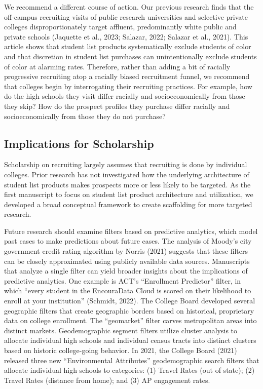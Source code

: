 \documentclass[
  12pt,
]{article}
\begin{document}
We recommend a different course of action. Our previous research finds that the off-campus recruiting visits of public research universities and selective private colleges disproportionately target affluent, predominantly white public and private schools (Jaquette et al., 2023; Salazar, 2022; Salazar et al., 2021). This article shows that student list products systematically exclude students of color and that discretion in student list purchases can unintentionally exclude students of color at alarming rates. Therefore, rather than adding a bit of racially progressive recruiting atop a racially biased recruitment funnel, we recommend that colleges begin by interrogating their recruiting practices. For example, how do the high schools they visit differ racially and socioeconomically from those they skip? How do the prospect profiles they purchase differ racially and socioeconomically from those they do not purchase?

\hypertarget{implications-for-scholarship}{%
\subsection{Implications for Scholarship}\label{implications-for-scholarship}}

Scholarship on recruiting largely assumes that recruiting is done by individual colleges. Prior research has not investigated how the underlying architecture of student list products makes prospects more or less likely to be targeted. As the first manuscript to focus on student list product architecture and utilization, we developed a broad conceptual framework to create scaffolding for more targeted research.

Future research should examine filters based on predictive analytics, which model past cases to make predictions about future cases. The analysis of Moody's city government credit rating algorithm by Norris (2021) suggests that these filters can be closely approximated using publicly available data sources. Manuscripts that analyze a single filter can yield broader insights about the implications of predictive analytics. One example is ACT's ``Enrollment Predictor'' filter, in which ``every student in the Encoura\textregistered Data Cloud is scored on their likelihood to enroll at your institution'' (Schmidt, 2022). The College Board developed several geographic filters that create geographic borders based on historical, proprietary data on college enrollment. The ``geomarket'' filter carves metropolitan areas into distinct markets. Geodemographic segment filters utilize cluster analysis to allocate individual high schools and individual census tracts into distinct clusters based on historic college-going behavior. In 2021, the College Board (2021) released three new ``Environmental Attributes'' geodemographic search filters that allocate individual high schools to categories: (1) Travel Rates (out of state); (2) Travel Rates (distance from home); and (3) AP engagement rates.
\end{document}
